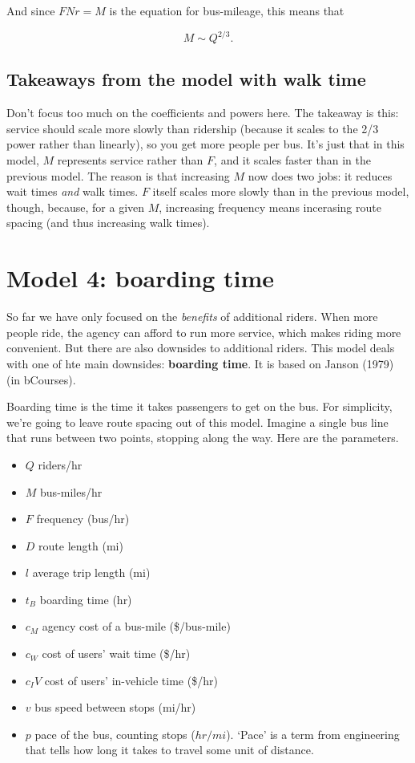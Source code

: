 \documentclass[11pt]{article}
\providecommand{\tightlist}{%
      \setlength{\itemsep}{0pt}\setlength{\parskip}{0pt}}
\begin{document}
And since \(FNr=M\) is the equation for bus-mileage, this means that

\[
M \sim Q^{2/3}.
\]

\subsection{Takeaways from the model with walk
time}\label{takeaways-from-the-model-with-walk-time}

Don't focus too much on the coefficients and powers here. The takeaway
is this: service should scale more slowly than ridership (because it
scales to the 2/3 power rather than linearly), so you get more people
per bus. It's just that in this model, \(M\) represents service rather
than \(F\), and it scales faster than in the previous model. The reason
is that increasing \(M\) now does two jobs: it reduces wait times
\emph{and} walk times. \(F\) itself scales more slowly than in the
previous model, though, because, for a given \(M\), increasing frequency
means incerasing route spacing (and thus increasing walk times).

    \section{Model 4: boarding time}\label{model-4-boarding-time}

So far we have only focused on the \emph{benefits} of additional riders.
When more people ride, the agency can afford to run more service, which
makes riding more convenient. But there are also downsides to additional
riders. This model deals with one of hte main downsides:
\textbf{boarding time}. It is based on Janson (1979) (in bCourses).

Boarding time is the time it takes passengers to get on the bus. For
simplicity, we're going to leave route spacing out of this model.
Imagine a single bus line that runs between two points, stopping along
the way. Here are the parameters.

\begin{itemize}
\tightlist
\item
  \(Q\) riders/hr
\item
  \(M\) bus-miles/hr
\item
  \(F\) frequency (bus/hr)
\item
  \(D\) route length (mi)
\item
  \(l\) average trip length (mi)
\item
  \(t_B\) boarding time (hr)
\item
  \(c_M\) agency cost of a bus-mile (\$/bus-mile)
\item
  \(c_W\) cost of users' wait time (\$/hr)
\item
  \(c_IV\) cost of users' in-vehicle time (\$/hr)
\item
  \(v\) bus speed between stops (mi/hr)
\item
  \(p\) pace of the bus, counting stops (\(hr/mi\)). `Pace' is a term
  from engineering that tells how long it takes to travel some unit of
  distance.
\end{itemize}
\end{document}
